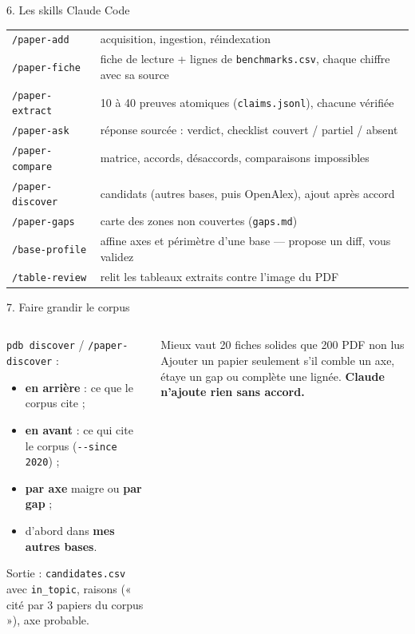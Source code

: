 \documentclass[aspectratio=169,11pt]{beamer}
\newcommand{\cmd}[1]{\texttt{\textcolor{blu}{#1}}}
\begin{document}
\begin{frame}{6. Les skills Claude Code}
  \small
  \renewcommand{\arraystretch}{1.2}
  \begin{tabularx}{\textwidth}{@{}lL@{}}
    \toprule
    \cmd{/paper-add}      & acquisition, ingestion, réindexation \\
    \cmd{/paper-fiche}    & fiche de lecture + lignes de \texttt{benchmarks.csv}, chaque chiffre avec sa source \\
    \cmd{/paper-extract}  & 10 à 40 preuves atomiques (\texttt{claims.jsonl}), chacune vérifiée \\
    \cmd{/paper-ask}      & réponse sourcée : verdict, checklist couvert / partiel / absent \\
    \cmd{/paper-compare}  & matrice, accords, désaccords, comparaisons impossibles \\
    \cmd{/paper-discover} & candidats (autres bases, puis OpenAlex), ajout après accord \\
    \cmd{/paper-gaps}     & carte des zones non couvertes (\texttt{gaps.md}) \\
    \cmd{/base-profile}   & affine axes et périmètre d'une base --- propose un diff, vous validez \\
    \cmd{/table-review}   & relit les tableaux extraits contre l'image du PDF \\
    \bottomrule
  \end{tabularx}
\end{frame}

\begin{frame}{7. Faire grandir le corpus}
  \begin{columns}[T]
    \begin{column}{0.55\textwidth}
      \cmd{pdb discover} / \cmd{/paper-discover} :
      \begin{itemize}
        \item \textbf{en arrière} : ce que le corpus cite ;
        \item \textbf{en avant} : ce qui cite le corpus (\cmd{-{}-since 2020}) ;
        \item \textbf{par axe} maigre ou \textbf{par gap} ;
        \item d'abord dans \textbf{mes autres bases}.
      \end{itemize}
      \medskip
      Sortie : \texttt{candidates.csv} avec \texttt{in\_topic}, raisons (« cité par 3 papiers du corpus »), axe probable.
    \end{column}
    \begin{column}{0.42\textwidth}
      \begin{exampleblock}{Mieux vaut 20 fiches solides que 200 PDF non lus}
        Ajouter un papier seulement s'il comble un axe, étaye un gap
        ou complète une lignée. \textbf{Claude n'ajoute rien sans accord.}
      \end{exampleblock}
    \end{column}
  \end{columns}
\end{frame}
\end{document}
